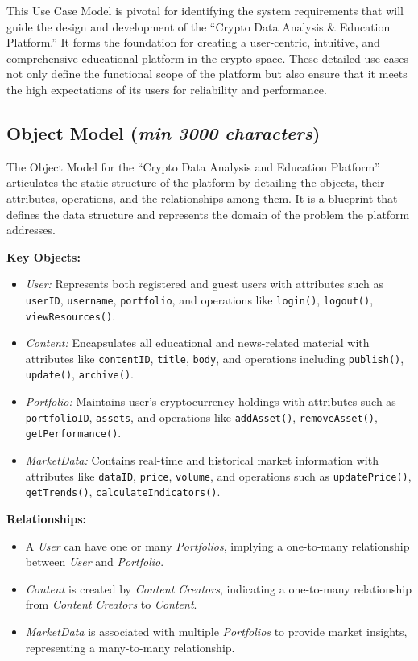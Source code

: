 \documentclass[12pt]{report}
\newcommand{\characters}[1]{(\textit{min #1 characters})}
\begin{document}
This Use Case Model is pivotal for identifying the system requirements that will guide the design and development of the ``Crypto Data Analysis \& Education Platform.'' It forms the foundation for creating a user-centric, intuitive, and comprehensive educational platform in the crypto space. These detailed use cases not only define the functional scope of the platform but also ensure that it meets the high expectations of its users for reliability and performance.

\subsection{Object Model \characters{3000}}
The Object Model for the ``Crypto Data Analysis and Education Platform'' articulates the static structure of the platform by detailing the objects, their attributes, operations, and the relationships among them. It is a blueprint that defines the data structure and represents the domain of the problem the platform addresses.

\textbf{Key Objects:}
\begin{itemize}
    \item \textit{User:} Represents both registered and guest users with attributes such as \texttt{userID}, \texttt{username}, \texttt{portfolio}, and operations like \texttt{login()}, \texttt{logout()}, \texttt{viewResources()}.
    \item \textit{Content:} Encapsulates all educational and news-related material with attributes like \texttt{contentID}, \texttt{title}, \texttt{body}, and operations including \texttt{publish()}, \texttt{update()}, \texttt{archive()}.
    \item \textit{Portfolio:} Maintains user's cryptocurrency holdings with attributes such as \texttt{portfolioID}, \texttt{assets}, and operations like \texttt{addAsset()}, \texttt{removeAsset()}, \texttt{getPerformance()}.
    \item \textit{MarketData:} Contains real-time and historical market information with attributes like \texttt{dataID}, \texttt{price}, \texttt{volume}, and operations such as \texttt{updatePrice()}, \texttt{getTrends()}, \texttt{calculateIndicators()}.
\end{itemize}

\textbf{Relationships:}
\begin{itemize}
    \item A \textit{User} can have one or many \textit{Portfolios}, implying a one-to-many relationship between \textit{User} and \textit{Portfolio}.
    \item \textit{Content} is created by \textit{Content Creators}, indicating a one-to-many relationship from \textit{Content Creators} to \textit{Content}.
    \item \textit{MarketData} is associated with multiple \textit{Portfolios} to provide market insights, representing a many-to-many relationship.
\end{itemize}
\end{document}
